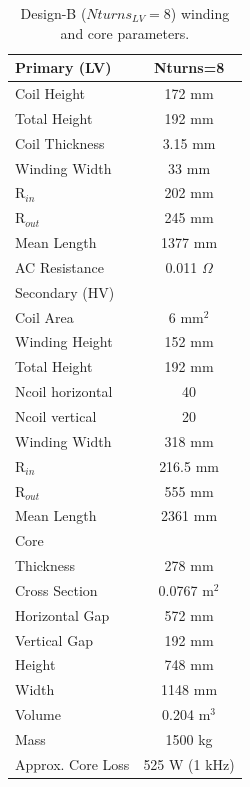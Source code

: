 \documentclass[a4paper, 11pt]{article} %
\begin{document}
\begin{table}[]
\begin{center}
\begin{tabular}{lc}
Primary (LV) & Nturns=8\\
\hline
Coil Height & 172 mm \\
Total Height & 192 mm \\
Coil Thickness & 3.15 mm\\
Winding Width & 33 mm \\
R$_{in}$ & 202 mm \\
R$_{out}$ & 245 mm \\
Mean Length & 1377 mm \\
AC Resistance & 0.011 $\Omega$ \\
\hline
Secondary (HV) \\
Coil Area & 6 mm$^2$\\
Winding Height & 152 mm \\ 
Total Height & 192 mm \\
Ncoil horizontal & 40 \\
Ncoil vertical & 20 \\
Winding Width & 318 mm \\
R$_{in}$ & 216.5 mm \\
R$_{out}$ & 555 mm \\
Mean Length & 2361 mm \\
\hline
Core \\
Thickness & 278 mm \\
Cross Section & 0.0767 m$^2$\\
Horizontal Gap & 572 mm \\
Vertical Gap & 192 mm \\
Height & 748 mm \\
Width & 1148 mm \\
Volume & 0.204 m$^3$ \\
Mass & 1500 kg \\
\hline
Approx. Core Loss & 525 W (1 kHz) \\
\hline
\end{tabular} 
\end{center}
\caption{Design-B ($Nturns_{LV}=8$) winding and core parameters.}
\label{design_B}
\end{table}
\end{document}
